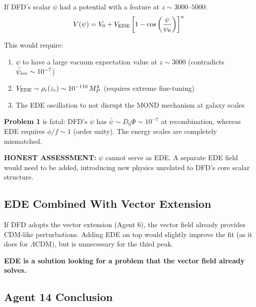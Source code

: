 \documentclass[11pt,a4paper]{article}
\begin{document}
If DFD's scalar $\psi$ had a potential with a feature at $z \sim 3000$--$5000$:
\begin{equation}
V(\psi) = V_0 + V_{\rm EDE}\left[1 - \cos\left(\frac{\psi}{\psi_0}\right)\right]^n
\end{equation}

This would require:
\begin{enumerate}
\item $\psi$ to have a large vacuum expectation value at $z \sim 3000$ (contradicts $\bar{\psi}_{\rm rec} \sim 10^{-7}$)
\item $V_{\rm EDE} \sim \rho_c(z_c) \sim 10^{-110}\,M_P^4$ (requires extreme fine-tuning)
\item The EDE oscillation to not disrupt the MOND mechanism at galaxy scales
\end{enumerate}

\textbf{Problem 1} is fatal: DFD's $\psi$ has $\bar{\psi} \sim D_0\Phi \sim 10^{-7}$ at recombination, whereas EDE requires $\phi/f \sim 1$ (order unity). The energy scales are completely mismatched.

\textbf{HONEST ASSESSMENT:} $\psi$ cannot serve as EDE. A separate EDE field would need to be added, introducing new physics unrelated to DFD's core scalar structure.

\subsection{EDE Combined With Vector Extension}

If DFD adopts the vector extension (Agent 6), the vector field already provides CDM-like perturbations. Adding EDE on top would slightly improve the fit (as it does for $\Lambda$CDM), but is unnecessary for the third peak.

\textbf{EDE is a solution looking for a problem that the vector field already solves.}

\subsection{Agent 14 Conclusion}
\end{document}
